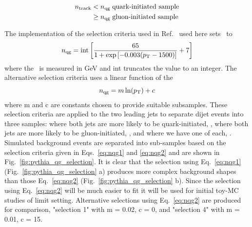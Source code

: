 \begin{align}
n_{\textrm{track}} & < n_{\textrm{qg}} \; \mbox{quark-initiated sample} \label{eq:QGselect} \\
	  & \ge n_{\textrm{qg}} \; \mbox{gluon-initiated sample} \nonumber
\end{align}

The implementation of the selection criteria used in Ref.~\cite{ATL-PHYS-PUB-2017-009} used here sets \nqg\ to 
\begin{equation}
n_{\textrm{qg}} = \mathrm{int} \left[ \frac{65}{1 + \exp\left[-0.003 (p_{\mathrm T} - 1500) \right]} +7 \right]  \label{eq:nqg1} 
\end{equation}
where the \pT\ is measured in GeV and int truncates the value to an integer. The alternative selection criteria uses a linear function of the \pT
\begin{equation}
n_{\textrm{qg}} = {m \ln(p_{\mathrm T}) + c}  \label{eq:nqg2}
\end{equation}
where m and c are constants chosen to provide suitable subsamples.
These selection criteria are applied to the two leading jets to separate dijet events into three samples:
where both jets are more likely to be quark-initiated, \QQ,  where both jets are more likely to
be gluon-initiated, \GG, and where we have one of each, \QG.
Simulated background events are separated into sub-samples based on the selection criteria given in
Eqs.~\ref{eq:nqg1} and \ref{eq:nqg2} and are shown in Fig.~\ref{fig:pythia_qg_selection}. It is clear that
the selection using Eq.~\ref{eq:nqg1} (Fig.~\ref{fig:pythia_qg_selection} a) produces more complex background shapes
than those Eq.~\ref{eq:nqg2} (Fig.~\ref{fig:pythia_qg_selection} b). Since the selection using  Eq.~\ref{eq:nqg2} will
be much easier to fit it will be used for initial toy-MC studies of limit setting. Alternative selections using Eq.~\ref{eq:nqg2} are produced for comparison, "selection 1" with m = 0.02, c = 0, and "selection 4" with m = 0.01, c = 15.


